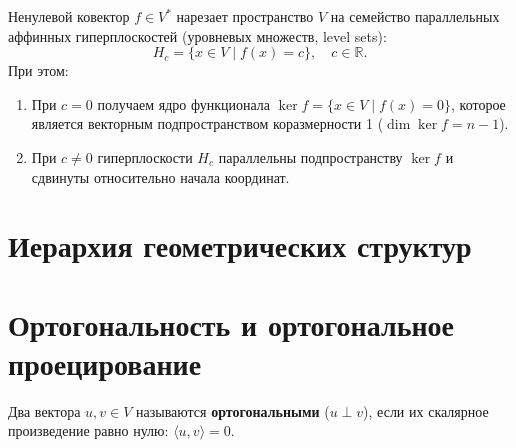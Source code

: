 \begin{proposition}
Ненулевой ковектор $f \in V^*$ нарезает пространство $V$ на семейство параллельных аффинных гиперплоскостей (уровневых
множеств, level sets):
\[ H_c = \{ x \in V \mid f(x) = c \}, \quad c \in \mathbb{R}. \]
При этом:
\begin{enumerate}
    \item При $c = 0$ получаем ядро функционала $\ker f = \{ x \in V \mid f(x) = 0 \}$, которое является векторным
    подпространством коразмерности 1 ($\dim \ker f = n - 1$).
    \item При $c \ne 0$ гиперплоскости $H_c$ параллельны подпространству $\ker f$ и сдвинуты относительно начала
    координат.
\end{enumerate}
\end{proposition}

\section{Иерархия геометрических структур}


\section{Ортогональность и ортогональное проецирование}

\begin{definition}[Orthogonality]
Два вектора $u, v \in V$ называются \textbf{ортогональными} ($u \perp v$), если их скалярное произведение равно нулю:
$\langle u, v \rangle = 0$.
\end{definition}

